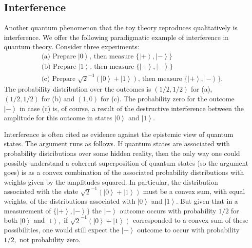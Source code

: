\documentclass[pra,twocolumn,nofootinbib,showpacs]{revtex4}
\begin{document}
\subsection{Interference}

\label{interference}

Another quantum phenomenon that the toy theory reproduces qualitatively is
interference. We offer the following paradigmatic example of interference in
quantum theory. Consider three experiments:
\begin{eqnarray*}
&&\text{(a) Prepare }\left| 0\right\rangle \text{, then measure }\{\left|
+\right\rangle ,\left| -\right\rangle \} \\
&&\text{(b) Prepare }\left| 1\right\rangle \text{, then measure }\{\left|
+\right\rangle ,\left| -\right\rangle \} \\
&&\text{(c) Prepare }\sqrt{2}^{-1}\left( \left| 0\right\rangle +\left|
1\right\rangle \right) \text{, then measure }\{\left| +\right\rangle ,\left|
-\right\rangle \} \text{.}
\end{eqnarray*}
The probability distribution over the outcomes is $(1/2,1/2)$ for (a), $%
(1/2,1/2)$ for (b) and $(1,0)$ for (c). The probability zero for the outcome
$\left| -\right\rangle$ in case (c) is, of course, a result of the
destructive interference between the amplitude for this outcome in states $%
\left| 0\right\rangle$ and $\left| 1\right\rangle$.


Interference is often cited as evidence against the epistemic view of
quantum states. The argument runs as follows. If quantum states are
associated with probability distributions over some hidden reality, then the
only way one could possibly understand a coherent superposition of quantum
states (so the argument goes) is as a convex combination of the associated
probability distributions with weights given by the amplitudes squared. In
particular, the distribution associated with the state $\sqrt{2}^{-1}\left(
\left| 0\right\rangle +\left| 1\right\rangle \right) $ must be a convex sum,
with equal weights, of the distributions associated with $\left|
0\right\rangle $ and $\left| 1\right\rangle .$ But given that in a
measurement of $\{\left| +\right\rangle ,\left| -\right\rangle \}$ the $%
\left| -\right\rangle $ outcome occurs with probability $1/2$ for both $%
\left| 0\right\rangle $ and $\left| 1\right\rangle ,$ if $\sqrt{2}%
^{-1}\left( \left| 0\right\rangle +\left| 1\right\rangle \right) $
corresponded to a convex sum of these possibilities, one would still expect
the $\left| -\right\rangle $ outcome to occur with probability $1/2,$ not
probability zero.
\end{document}

